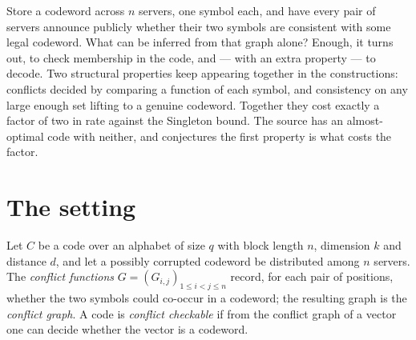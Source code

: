 \documentclass{aicr-conjecture}
\begin{document}

\vspace{0.4em}

\begin{informalconjecture}
Store a codeword across $n$ servers, one symbol each, and have every pair
of servers announce publicly whether their two symbols are consistent
with some legal codeword. What can be inferred from that graph alone?
Enough, it turns out, to check membership in the code, and --- with an
extra property --- to decode. Two structural properties keep appearing
together in the constructions: conflicts decided by comparing a function
of each symbol, and consistency on any large enough set lifting to a
genuine codeword. Together they cost exactly a factor of two in rate
against the Singleton bound. The source has an almost-optimal code with
neither, and conjectures the first property is what costs the factor.
\end{informalconjecture}

\section{The setting}\label{sec:setting}

Let $C$ be a code over an alphabet of size $q$ with block length $n$,
dimension $k$ and distance $d$, and let a possibly corrupted codeword be
distributed among $n$ servers. The \emph{conflict functions}
$G = (G_{i,j})_{1 \le i < j \le n}$ record, for each pair of positions,
whether the two symbols could co-occur in a codeword; the resulting
graph is the \emph{conflict graph}. A code is \emph{conflict checkable}
if from the conflict graph of a vector one can decide whether the vector
is a codeword.
\end{document}
